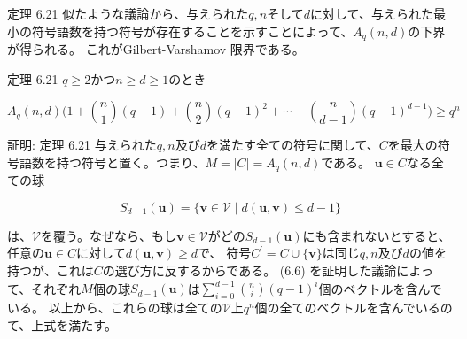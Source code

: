 \documentclass[dvipdfmx,10pt,jsarticle]{beamer}
\begin{document}
  \begin{frame}{定理 6.21} 似たような議論から、与えられた$q, n$そして$d$に対して、与えられた最小の符号語数を持つ符号が存在することを示すことによって、$A_q(n, d)$の下界が得られる。
    これがGilbert-Varshamov 限界である。

    \begin{block}{定理 6.21}
      $q \geq 2$かつ$n \geq d \geq 1$のとき

  \[A_q (n, d) \big( 1 + \binom n1 (q - 1) + \binom n2 {(q- 1)}^2 + \cdots + \binom{n}{d - 1} {(q - 1)}^{d -1}  \big) \geq q^n \]
    \end{block}
  \end{frame}


  \begin{frame}{証明: 定理 6.21}
      与えられた$q, n$及び$d$を満たす全ての符号に関して、$C$を最大の符号語数を持つ符号と置く。つまり、$M = \mid C \mid = A_q (n, d)$である。
      $\mathbf{u} \in C$なる全ての球

      \[ S_{d - 1} (\mathbf{u}) = \lbrace \mathbf{v} \in \mathcal{V} \mid d(\mathbf{u}, \mathbf{v}) \leq d - 1 \rbrace \]

      は、$\mathcal{V}$を覆う。なぜなら、もし$\mathbf{v} \in \mathcal{V}$がどの$S_{d - 1} (\mathbf{u})$にも含まれないとすると、任意の$\mathbf{u} \in C$に対して$d (\mathbf{u}, \mathbf{v}) \geq d$で、
      符号$C^\prime = C \cup \lbrace \mathbf{v} \rbrace$は同じ$q, n$及び$d$の値を持つが、これは$C$の選び方に反するからである。
      (6.6) を証明した議論によって、それぞれ$M$個の球$S_{d-1}(\mathbf{u})$は$\sum_{i=0}^{d-1}\binom ni {(q - 1)}^i$個のベクトルを含んでいる。
      以上から、これらの球は全ての$\mathcal{V}$上$q^n$個の全てのベクトルを含んでいるのて、上式を満たす。

  \end{frame}
\end{document}
